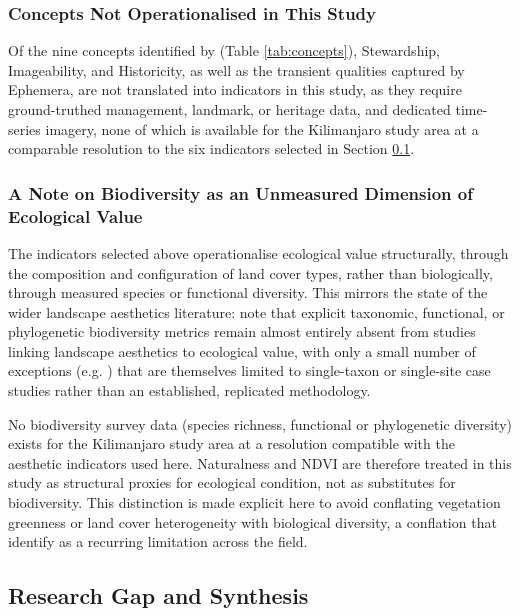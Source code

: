 \documentclass[hidelinks, 11pt]{article}
\begin{document}
\subsubsection{Concepts Not Operationalised in This Study}\label{sec:NotOp}
Of the nine concepts identified by \citet{ode_capturing_2008} (Table \ref{tab:concepts}), Stewardship, Imageability, and Historicity, as well as the transient qualities captured by Ephemera, are not translated into indicators in this study, as they require ground-truthed management, landmark, or heritage data, and dedicated time-series imagery, none of which is available for the Kilimanjaro study area at a comparable resolution to the six indicators selected in Section \ref{sec:LI}.

\subsubsection{A Note on Biodiversity as an Unmeasured Dimension of Ecological Value}\label{sec:BDLimit}
The indicators selected above operationalise ecological value structurally, through the composition and configuration of land cover types, rather than biologically, through measured species or functional diversity. This mirrors the state of the wider landscape aesthetics literature: \citet{tribot_integrating_2018} note that explicit taxonomic, functional, or phylogenetic biodiversity metrics remain almost entirely absent from studies linking landscape aesthetics to ecological value, with only a small number of exceptions (e.g. \citet{tribot_integrating_2018,southon_biodiverse_2017,haas_can_2015}) that are themselves limited to single-taxon or single-site case studies rather than an established, replicated methodology.

No biodiversity survey data (species richness, functional or phylogenetic diversity) exists for the Kilimanjaro study area at a resolution compatible with the aesthetic indicators used here. Naturalness and NDVI are therefore treated in this study as structural proxies for ecological condition, not as substitutes for biodiversity. This distinction is made explicit here to avoid conflating vegetation greenness or land cover heterogeneity with biological diversity, a conflation that \citet{tribot_integrating_2018} identify as a recurring limitation across the field.


\subsection{Research Gap and Synthesis}\label{sec:LI}
\end{document}
